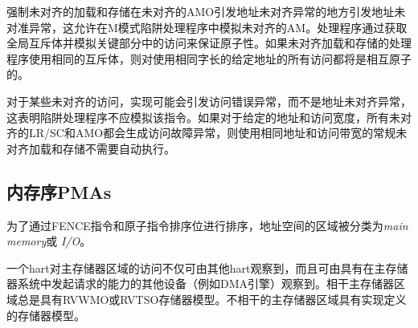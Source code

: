 {\begin{commentary}
强制未对齐的加载和存储在未对齐的AMO引发地址未对齐异常的地方引发地址未对准异常，这允许在M模式陷阱处理程序中模拟未对齐的AM。处理程序通过获取全局互斥体并模拟关键部分中的访问来保证原子性。如果未对齐加载和存储的处理程序使用相同的互斥体，则对使用相同字长的给定地址的所有访问都将是相互原子的。
\end{commentary}

\iffalse
Implementations may raise access-fault exceptions instead of address-misaligned
exceptions for some misaligned accesses, indicating the instruction should not
be emulated by a trap handler.  If, for a given address and access width, all
misaligned LRs/SCs and AMOs generate access-fault exceptions, then regular
misaligned loads and stores using the same address and access width are not
required to execute atomically.
\fi
对于某些未对齐的访问，实现可能会引发访问错误异常，而不是地址未对齐异常，这表明陷阱处理程序不应模拟该指令。如果对于给定的地址和访问宽度，所有未对齐的LR/SC和AMO都会生成访问故障异常，则使用相同地址和访问带宽的常规未对齐加载和存储不需要自动执行。


\subsection{内存序PMAs}

\iffalse
Regions of the address space are classified as either {\em main
  memory} or {\em I/O} for the purposes of ordering by the FENCE
instruction and atomic-instruction ordering bits.
\fi
为了通过FENCE指令和原子指令排序位进行排序，地址空间的区域被分类为{\em main
memory}或 {\em I/O}。

\iffalse
Accesses by one hart to main memory regions are observable not only by
other harts but also by other devices with the capability to initiate
requests in the main memory system (e.g., DMA engines).
Coherent main memory regions always have either the RVWMO or RVTSO memory
model.
Incoherent main memory regions have an implementation-defined memory model.
\fi
一个hart对主存储器区域的访问不仅可由其他hart观察到，而且可由具有在主存储器系统中发起请求的能力的其他设备（例如DMA引擎）观察到。相干主存储器区域总是具有RVWMO或RVTSO存储器模型。不相干的主存储器区域具有实现定义的存储器模型。

}
